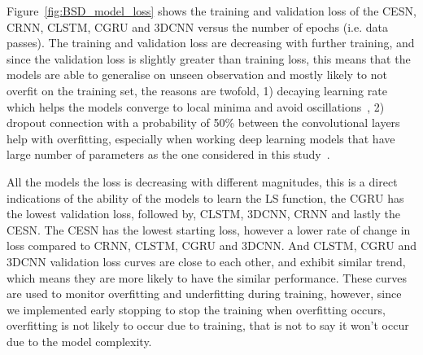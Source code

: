 \documentclass{WitsPhysicsReport}
\begin{document}
Figure~\ref{fig:BSD_model_loss} shows the training and validation loss of the CESN, CRNN, CLSTM, CGRU and 3DCNN versus the number of epochs (i.e. data passes). The training and validation loss are decreasing with further training, and since the validation loss is slightly greater than training loss, this means that the models are able to generalise on unseen observation and mostly likely to not overfit on the training set, the reasons are twofold, 1) decaying learning rate which helps the models converge to local minima and avoid oscillations~\cite{you2019does}, 2) dropout connection with a probability of 50\% between the convolutional layers help with overfitting, especially when working deep learning models that have large number of parameters as the one considered in this study~\cite{hinton2012improving}.


All the models the loss is decreasing with different magnitudes, this is a direct indications of the ability of the models to learn the LS function, the CGRU has the lowest validation loss, followed by, CLSTM, 3DCNN, CRNN and lastly the CESN. The CESN has the lowest starting loss, however a lower rate of change in loss compared to CRNN, CLSTM, CGRU and 3DCNN. And CLSTM, CGRU and 3DCNN validation loss curves are close to each other, and exhibit similar trend, which means they are more likely to have the similar performance. These curves are used to monitor overfitting and underfitting during training, however, since we implemented early stopping to stop the training when overfitting occurs, overfitting is not likely to occur due to training, that is not to say it won't occur due to the model complexity.


\end{document}
